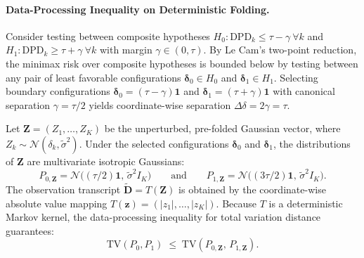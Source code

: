 \documentclass[preprint,12pt]{elsarticle}
\theoremstyle{plain}
\theoremstyle{definition}
\theoremstyle{remark}
\newcommand{\dpd}{\mathrm{DPD}}
\begin{document}
\paragraph{Data-Processing Inequality on Deterministic Folding.} Consider testing between composite hypotheses $H_0: \dpd_k \le \tau - \gamma\ \forall k$ and $H_1: \dpd_k \ge \tau + \gamma\ \forall k$ with margin $\gamma \in (0, \tau)$. By Le Cam's two-point reduction, the minimax risk over composite hypotheses is bounded below by testing between any pair of least favorable configurations $\bm{\delta}_0 \in H_0$ and $\bm{\delta}_1 \in H_1$. Selecting boundary configurations $\bm{\delta}_0 = (\tau - \gamma)\bm{1}$ and $\bm{\delta}_1 = (\tau + \gamma)\bm{1}$ with canonical separation $\gamma = \tau/2$ yields coordinate-wise separation $\Delta\delta = 2\gamma = \tau$.

Let $\bm{Z} = (Z_1,\dots,Z_K)$ be the unperturbed, pre-folded Gaussian vector, where $Z_k \sim \mathcal{N}(\delta_k, \tilde\sigma^2)$. Under the selected configurations $\bm{\delta}_0$ and $\bm{\delta}_1$, the distributions of $\bm{Z}$ are multivariate isotropic Gaussians:
\begin{equation}
P_{0,\bm{Z}} = \mathcal{N}\big((\tau/2)\bm{1},\, \tilde\sigma^2 I_K\big) \qquad\text{and}\qquad P_{1,\bm{Z}} = \mathcal{N}\big((3\tau/2)\bm{1},\, \tilde\sigma^2 I_K\big).
\end{equation}
The observation transcript $\widetilde{\bm{D}} = T(\bm{Z})$ is obtained by the coordinate-wise absolute value mapping $T(\bm{z}) = (\lvert z_1 \rvert,\dots,\lvert z_K \rvert)$. Because $T$ is a deterministic Markov kernel, the data-processing inequality for total variation distance guarantees:
\begin{equation}
\mathrm{TV}(P_0, P_1) \;\le\; \mathrm{TV}(P_{0,\bm{Z}},\, P_{1,\bm{Z}}).
\label{eq:app_dpi}
\end{equation}
\end{document}
